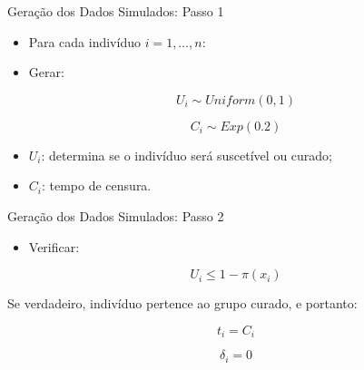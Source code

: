 \documentclass[aspectratio=169,t,xcolor=table]{beamer}
\begin{document}
\begin{frame}{Geração dos Dados Simulados: Passo 1}

\begin{itemize}
\item Para cada indivíduo $i=1,\ldots,n$:

\vspace{0.4cm}

\item Gerar:

\end{itemize}

\[
U_i \sim Uniform(0,1)
\]

\[
C_i \sim Exp(0.2)
\]

\vspace{0.4cm}

\begin{itemize}
\item $U_i$: determina se o indivíduo será suscetível ou curado;

\vspace{0.2cm}

\item $C_i$: tempo de censura.

\end{itemize}

\end{frame}

\begin{frame}{Geração dos Dados Simulados: Passo 2}

\begin{itemize}
\item Verificar:
\end{itemize}

\[
U_i \leq 1-\pi(x_i)
\]

\vspace{0.5cm}

Se verdadeiro, indivíduo pertence ao grupo curado, e portanto:

\vspace{0.3cm}

\[
t_i=C_i
\]

\[
\delta_i=0
\]

\end{frame}
\end{document}
